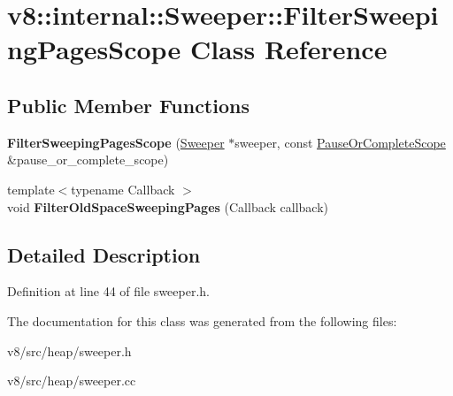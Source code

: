 \hypertarget{classv8_1_1internal_1_1Sweeper_1_1FilterSweepingPagesScope}{}\section{v8\+:\+:internal\+:\+:Sweeper\+:\+:Filter\+Sweeping\+Pages\+Scope Class Reference}
\label{classv8_1_1internal_1_1Sweeper_1_1FilterSweepingPagesScope}
\subsection*{Public Member Functions}
\begin{DoxyCompactItemize}
\item 
\mbox{\label{classv8_1_1internal_1_1Sweeper_1_1FilterSweepingPagesScope_a663c4289e2bb7e92d51e1dbe2bebb896}} 
{\bfseries Filter\+Sweeping\+Pages\+Scope} (\mbox{\hyperlink{classv8_1_1internal_1_1Sweeper}{Sweeper}} $\ast$sweeper, const \mbox{\hyperlink{classv8_1_1internal_1_1Sweeper_1_1PauseOrCompleteScope}{Pause\+Or\+Complete\+Scope}} \&pause\+\_\+or\+\_\+complete\+\_\+scope)
\item 
\mbox{\label{classv8_1_1internal_1_1Sweeper_1_1FilterSweepingPagesScope_ac439dc8678f93ecb11861a9ee9a09901}} 
{\footnotesize template$<$typename Callback $>$ }\\void {\bfseries Filter\+Old\+Space\+Sweeping\+Pages} (Callback callback)
\end{DoxyCompactItemize}


\subsection{Detailed Description}


Definition at line 44 of file sweeper.\+h.



The documentation for this class was generated from the following files\+:\begin{DoxyCompactItemize}
\item 
v8/src/heap/sweeper.\+h\item 
v8/src/heap/sweeper.\+cc\end{DoxyCompactItemize}
